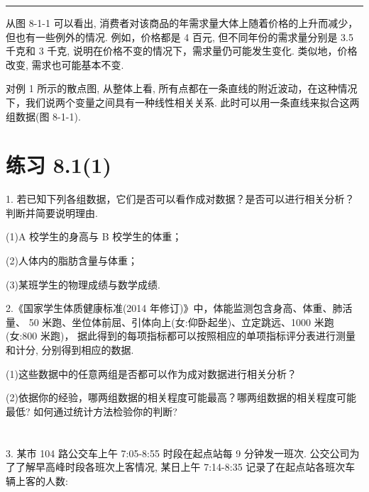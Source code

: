 \documentclass[10pt]{article}
\newcommand{\HRule}{\begin{center}\rule{0.9\linewidth}{0.2mm}\end{center}}
\begin{document}
\HRule

从图 8-1-1 可以看出, 消费者对该商品的年需求量大体上随着价格的上升而减少，但也有一些例外的情况. 例如，价格都是 4 百元, 但不同年份的需求量分别是 3.5 千克和 3 千克, 说明在价格不变的情况下，需求量仍可能发生变化. 类似地，价格改变, 需求也可能基本不变.

对例 1 所示的散点图, 从整体上看, 所有点都在一条直线的附近波动，在这种情况下，我们说两个变量之间具有一种线性相关关系. 此时可以用一条直线来拟合这两组数据(图 8-1-1).

\section*{练习 8.1(1)}

1. 若已知下列各组数据，它们是否可以看作成对数据？是否可以进行相关分析？判断并简要说明理由.

(1)A 校学生的身高与 B 校学生的体重；

(2)人体内的脂肪含量与体重；

(3)某班学生的物理成绩与数学成绩.

2.《国家学生体质健康标准(2014 年修订)》中，体能监测包含身高、体重、肺活量、 50 米跑、坐位体前屈、引体向上(女:仰卧起坐)、立定跳远、1000 米跑(女:800 米跑)， 据此得到的每项指标都可以按照相应的单项指标评分表进行测量和计分, 分别得到相应的数据.

(1)这些数据中的任意两组是否都可以作为成对数据进行相关分析？

(2)依据你的经验，哪两组数据的相关程度可能最高？哪两组数据的相关程度可能最低? 如何通过统计方法检验你的判断?

\section*{}

3. 某市 104 路公交车上午 7:05-8:55 时段在起点站每 9 分钟发一班次. 公交公司为了了解早高峰时段各班次上客情况, 某日上午 7:14-8:35 记录了在起点站各班次车辆上客的人数:

\begin{center}
\end{center}
\end{document}
